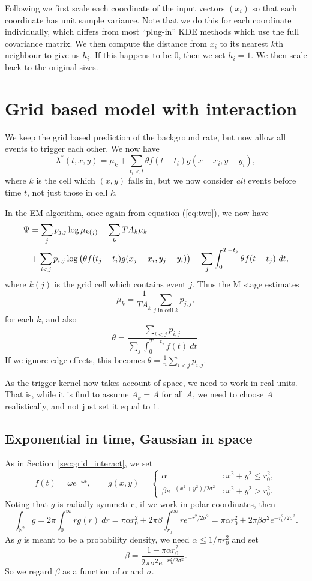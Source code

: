\documentclass[twoside,a4paper]{article}
\theoremstyle{plain}
\theoremstyle{definition}
\begin{document}
Following \cite{sepp} we first scale each coordinate of the input vectors $(x_i)$ so that
each coordinate has unit sample variance.  Note that we do this for each coordinate
individually, which differs from most ``plug-in'' KDE methods which use the full covariance
matrix.  We then compute the distance from $x_i$ to its nearest $k$th neighbour to give
us $h_i$.  If this happens to be $0$, then we set $h_i=1$.  We then scale back to the original
sizes.





\section{Grid based model with interaction}\label{app:grid_interact}

We keep the grid based prediction of the background rate, but now allow all events to
trigger each other.  We now have
\[ \lambda^*(t,x,y) = \mu_k + \sum_{t_i<t} \theta f(t-t_i) g(x-x_i, y-y_i), \]
where $k$ is the cell which $(x,y)$ falls in, but we now consider \emph{all} events before
time $t$, not just those in cell $k$.

In the EM algorithm, once again from equation (\ref{eq:two}), we now have
\begin{align}
\Psi &= \sum_j p_{j,j} \log \mu_{k(j)} - \sum_k T A_k \mu_k \notag \\
&+ \sum_{i<j} p_{i,j} \log\big(\theta f(t_j-t_i) g(x_j-x_i, y_j-y_i)\big)
- \sum_j \int_0^{T-t_j} \theta f(t-t_j) \ dt,
\label{eq:gen_one}
\end{align}
where $k(j)$ is the grid cell which contains event $j$.  Thus the M stage estimates
\[ \mu_k = \frac{1}{TA_k} \sum_{j\text{ in cell }k} p_{j,j}, \]
for each $k$, and also
\[ \theta = \frac{\sum_{i<j} p_{i,j}}{\sum_j \int_0^{T-t_j} f(t) \ dt}. \]
If we ignore edge effects, this becomes $\theta = \frac{1}{n} \sum_{i<j} p_{i,j}$.

As the trigger kernel now takes account of space, we need to work in real units.  That is,
while it is find to assume $A_k=A$ for all $A$, we need to choose $A$ realistically, and
not just set it equal to $1$.


\subsection{Exponential in time, Gaussian in space}

As in Section~\ref{sec:grid_interact}, we set
\[ f(t) = \omega e^{-\omega t}, \qquad
g(x,y) = \begin{cases} \alpha &: x^2+y^2\leq r_0^2, \\
\beta e^{-(x^2+y^2)/2\sigma^2} &: x^2+y^2 > r_0^2. \end{cases} \]
Noting that $g$ is radially symmetric, if we work in polar coordinates, then
\[ \int_{\mathbb R^2} g = 2\pi\int_0^\infty r g(r) \ dr
= \pi\alpha r_0^2 + 2\pi\beta\int_{r_0}^\infty r e^{-r^2/2\sigma^2}
= \pi\alpha r_0^2 + 2\pi\beta\sigma^2 e^{-r_0^2/2\sigma^2}. \]
As $g$ is meant to be a probability density, we need $\alpha \leq 1/ \pi r_0^2$ and
set
\[ \beta = \frac{1 - \pi\alpha r_0^2}{2\pi\sigma^2 e^{-r_0^2/2\sigma^2}}. \]
So we regard $\beta$ as a function of $\alpha$ and $\sigma$.
\end{document}
